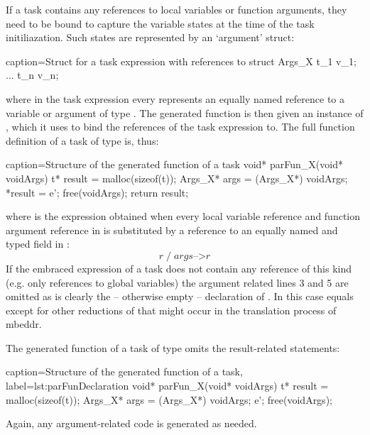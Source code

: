 If a task contains any references to local variables or function arguments, they need to be bound to capture the variable states at the time of the task initiliazation. Such states are represented by an `argument' struct:

\begin{ccode}{caption=Struct for a task expression with references  to }
struct Args_X {
  t_1 v_1;
  ...
  t_n v_n;
}
\end{ccode}

where in the task expression every  represents an equally named reference to a variable or argument of type . The generated function  is then given an instance of , which it uses to bind the references of the task expression to. The full function definition of a task  of type  is, thus:

\begin{ccode}{caption=Structure of the generated function of a task}
void* parFun_X(void* voidArgs) {
  t* result = malloc(sizeof(t));
  Args_X* args = (Args_X*) voidArgs;
  *result = e';
  free(voidArgs);
  return result;
}
\end{ccode}

where  is the expression obtained when every local variable reference and function argument reference  in  is substituted by a reference to an equally named and typed field in :
\begin{equation}
r\;/\;\mathit{args}\text{-->}r
\end{equation}
If the embraced expression of a task does not contain any reference of this kind (e.g. only references to global variables) the argument related lines 3 and 5 are omitted as is clearly the -- otherwise empty -- declaration of . In this case  equals  except for other reductions of  that might occur in the translation process of mbeddr.

The generated function of a task of type  omits the result-related statements:

\begin{ccode}{caption=Structure of the generated function of a  task, label=lst:parFunDeclaration}
void* parFun_X(void* voidArgs) {
  t* result = malloc(sizeof(t));
  Args_X* args = (Args_X*) voidArgs;
  e';
  free(voidArgs);
}
\end{ccode}

Again, any argument-related code is generated as needed.


